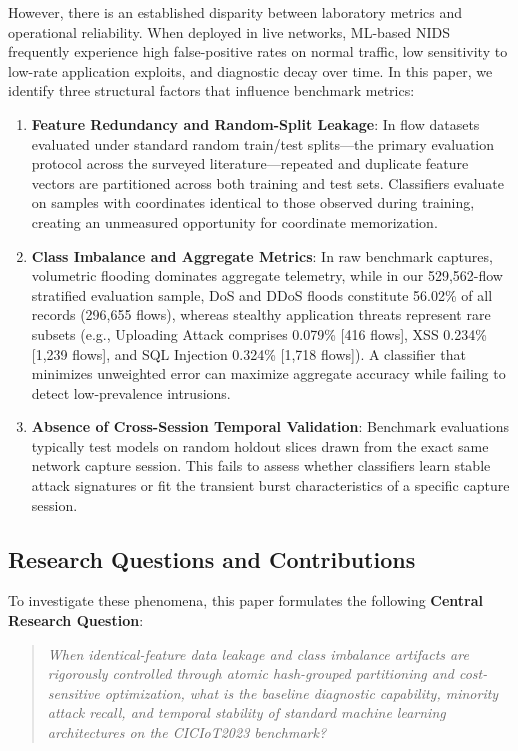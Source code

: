 \documentclass[conference,10pt,twocolumn]{IEEEtran}
\begin{document}
However, there is an established disparity between laboratory metrics and operational reliability. When deployed in live networks, ML-based NIDS frequently experience high false-positive rates on normal traffic, low sensitivity to low-rate application exploits, and diagnostic decay over time. In this paper, we identify three structural factors that influence benchmark metrics:
\begin{enumerate}
    \item \textbf{Feature Redundancy and Random-Split Leakage}: In flow datasets evaluated under standard random train/test splits---the primary evaluation protocol across the surveyed literature---repeated and duplicate feature vectors are partitioned across both training and test sets. Classifiers evaluate on samples with coordinates identical to those observed during training, creating an unmeasured opportunity for coordinate memorization.
    \item \textbf{Class Imbalance and Aggregate Metrics}: In raw benchmark captures, volumetric flooding dominates aggregate telemetry, while in our 529,562-flow stratified evaluation sample, DoS and DDoS floods constitute 56.02\% of all records (296,655 flows), whereas stealthy application threats represent rare subsets (e.g., Uploading Attack comprises 0.079\% [416 flows], XSS 0.234\% [1,239 flows], and SQL Injection 0.324\% [1,718 flows]). A classifier that minimizes unweighted error can maximize aggregate accuracy while failing to detect low-prevalence intrusions.
    \item \textbf{Absence of Cross-Session Temporal Validation}: Benchmark evaluations typically test models on random holdout slices drawn from the exact same network capture session. This fails to assess whether classifiers learn stable attack signatures or fit the transient burst characteristics of a specific capture session.
\end{enumerate}

\subsection{Research Questions and Contributions}
To investigate these phenomena, this paper formulates the following \textbf{Central Research Question}:
\begin{quote}
\textit{When identical-feature data leakage and class imbalance artifacts are rigorously controlled through atomic hash-grouped partitioning and cost-sensitive optimization, what is the baseline diagnostic capability, minority attack recall, and temporal stability of standard machine learning architectures on the CICIoT2023 benchmark?}
\end{quote}
\end{document}

